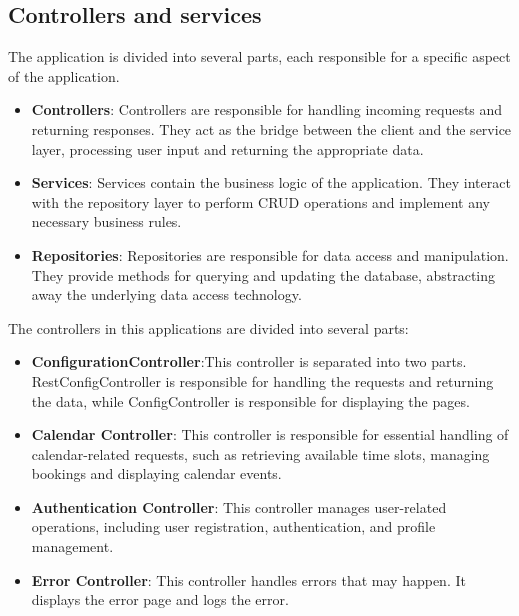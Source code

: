 \subsection{Controllers and services}\label{subsec:controllers-and-services}
The application is divided into several parts, each responsible for a specific aspect of the application.
\begin{itemize}
    \item \textbf{Controllers}: Controllers are responsible for handling incoming requests and returning responses.
    They act as the bridge between the client and the service layer, processing user input and returning the appropriate data.

    \item \textbf{Services}: Services contain the business logic of the application.
    They interact with the repository layer to perform CRUD operations and implement any necessary business rules.

    \item \textbf{Repositories}: Repositories are responsible for data access and manipulation.
    They provide methods for querying and updating the database, abstracting away the underlying data access technology.
\end{itemize}

The controllers in this applications are divided into several parts:
\begin{itemize}
    \item \textbf{ConfigurationController}:This controller is separated into two parts.
    RestConfigController is responsible for handling the requests and returning the data, while ConfigController is responsible for displaying the pages.

    \item \textbf{Calendar Controller}: This controller is responsible for essential handling of calendar-related requests, such as retrieving available time slots, managing bookings and displaying calendar events.

    \item \textbf{Authentication Controller}: This controller manages user-related operations, including user registration, authentication, and profile management.

    \item \textbf{Error Controller}: This controller handles errors that may happen.
    It displays the error page and logs the error.
\end{itemize}


